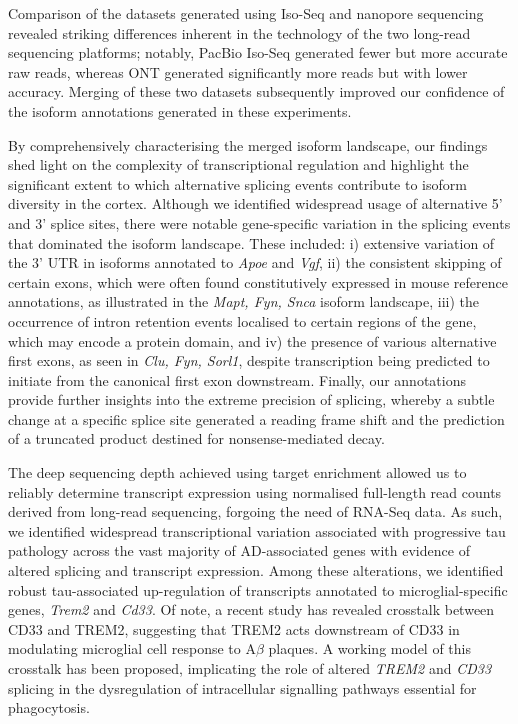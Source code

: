 Comparison of the datasets generated using Iso-Seq and nanopore sequencing revealed striking differences inherent in the technology of the two long-read sequencing platforms; notably, PacBio Iso-Seq generated fewer but more accurate raw reads, whereas ONT generated significantly more reads but with lower accuracy. Merging of these two datasets subsequently improved our confidence of the isoform annotations generated in these experiments.

By comprehensively characterising the merged isoform landscape, our findings shed light on the complexity of transcriptional regulation and highlight the significant extent to which alternative splicing events contribute to isoform diversity in the cortex. Although we identified widespread usage of alternative 5' and 3' splice sites, there were notable gene-specific variation in the splicing events that dominated the isoform landscape. These included: i) extensive variation of the 3' UTR in isoforms annotated to \textit{Apoe} and \textit{Vgf}, ii) the consistent skipping of certain exons, which were often found constitutively expressed in mouse reference annotations, as illustrated in the \textit{Mapt, Fyn, Snca} isoform landscape, iii) the occurrence of intron retention events localised to certain regions of the gene, which may encode a protein domain, and iv) the presence of various alternative first exons, as seen in \textit{Clu, Fyn, Sorl1}, despite transcription being predicted to initiate from the canonical first exon downstream. Finally, our annotations provide further insights into the extreme precision of splicing, whereby a subtle change at a specific splice site generated a reading frame shift and the prediction of a truncated product destined for nonsense-mediated decay. 

The deep sequencing depth achieved using target enrichment allowed us to reliably determine transcript expression using normalised full-length read counts derived from long-read sequencing, forgoing the need of RNA-Seq data. As such, we identified widespread transcriptional variation associated with progressive tau pathology across the vast majority of AD-associated genes with evidence of altered splicing and transcript expression. Among these alterations, we identified robust tau-associated up-regulation of transcripts annotated to microglial-specific genes, \textit{Trem2} and \textit{Cd33}. Of note, a recent study has revealed crosstalk between CD33 and TREM2, suggesting that TREM2 acts downstream of CD33 in modulating microglial cell response to A$\beta$ plaques\cite{Griciuc2019}. A working model of this crosstalk has been proposed, implicating the role of altered \textit{TREM2} and \textit{CD33} splicing in the dysregulation of intracellular signalling pathways essential for phagocytosis\cite{Griciuc2021}.

